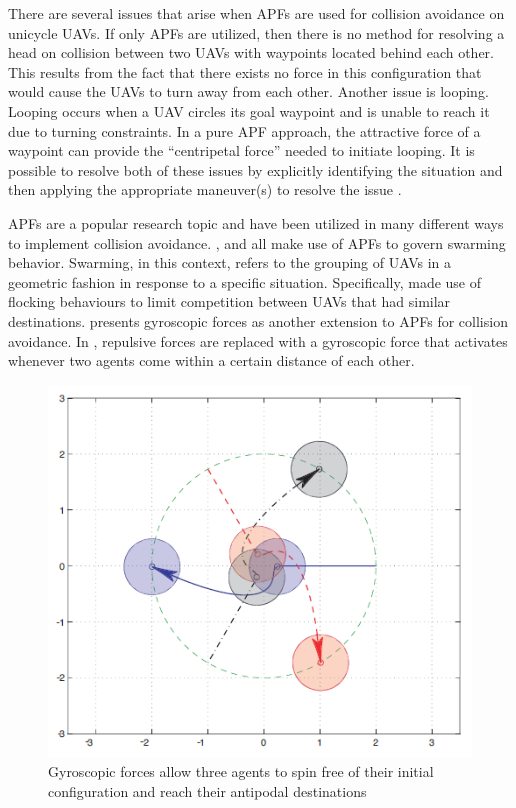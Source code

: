 \documentclass[conference]{IEEEtran}
\begin{document}
There are several issues that arise when APFs are used for collision avoidance on unicycle UAVs.  If only APFs are utilized, then there is no method for resolving a head on collision between two UAVs with waypoints located behind each other.  This results from the fact that there exists no force in this configuration that would cause the UAVs to turn away from each other.  Another issue is looping.  Looping occurs when a UAV circles its goal waypoint and is unable to reach it due to turning constraints.  In a pure APF approach, the attractive force of a waypoint can provide the “centripetal force” needed to initiate looping.  It is possible to resolve both of these issues by explicitly identifying the situation and then applying the appropriate maneuver(s) to resolve the issue \cite{ruchti2011uav}.

APFs are a popular research topic and have been utilized in many different ways to implement collision avoidance.   \cite{ruchti2011uav}, \cite{balch2000social} and \cite{barnes2006swarm} all make use of APFs to govern swarming behavior.  Swarming, in this context, refers to the grouping of UAVs in a geometric fashion in response to a specific situation. Specifically,  \cite{ruchti2011uav} made use of flocking behaviours to limit competition between UAVs that had similar destinations.  \cite{chang2003collision} presents gyroscopic forces as another extension to APFs for collision avoidance.  In \cite{chang2003collision}, repulsive forces are replaced with a gyroscopic force that activates whenever two agents come within a certain distance of each other.

\begin{figure}
	\includegraphics [width=1\columnwidth] {2003Chang}
	\caption{Gyroscopic forces allow three agents to spin free of their initial configuration and reach their antipodal destinations \cite{chang2003collision}}
	\label{fig:2003Chang}
\end{figure}
\end{document}
